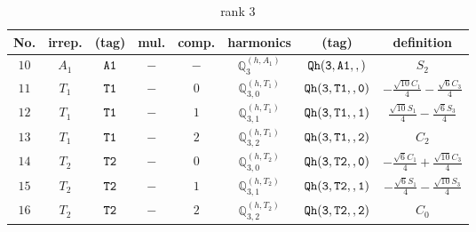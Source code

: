 \documentclass[fleqn,8pt]{jsarticle}
\begin{document}
\begin{table}[ht!]
\begin{center}
\caption{rank 3}
\renewcommand{\arraystretch}{1.3}
\begin{tabular}{cccccccc} \hline \hline
No. & irrep. & (tag) & mul. & comp. & harmonics & (tag) & definition \\ \hline
$ 10 $ & $ A_{1} $ & $ {\tt A1} $ & $ - $ & $ - $ & $ \mathbb{Q}_{3}^{(h,A_{1})} $ & $ {\tt Qh(3,A1,,)} $ & $ S_{2} $ \\
$ 11 $ & $ T_{1} $ & $ {\tt T1} $ & $ - $ & $ 0 $ & $ \mathbb{Q}_{3,0}^{(h,T_{1})} $ & $ {\tt Qh(3,T1,,0)} $ & $ - \frac{\sqrt{10} C_{1}}{4} - \frac{\sqrt{6} C_{3}}{4} $ \\
$ 12 $ & $ T_{1} $ & $ {\tt T1} $ & $ - $ & $ 1 $ & $ \mathbb{Q}_{3,1}^{(h,T_{1})} $ & $ {\tt Qh(3,T1,,1)} $ & $ \frac{\sqrt{10} S_{1}}{4} - \frac{\sqrt{6} S_{3}}{4} $ \\
$ 13 $ & $ T_{1} $ & $ {\tt T1} $ & $ - $ & $ 2 $ & $ \mathbb{Q}_{3,2}^{(h,T_{1})} $ & $ {\tt Qh(3,T1,,2)} $ & $ C_{2} $ \\
$ 14 $ & $ T_{2} $ & $ {\tt T2} $ & $ - $ & $ 0 $ & $ \mathbb{Q}_{3,0}^{(h,T_{2})} $ & $ {\tt Qh(3,T2,,0)} $ & $ - \frac{\sqrt{6} C_{1}}{4} + \frac{\sqrt{10} C_{3}}{4} $ \\
$ 15 $ & $ T_{2} $ & $ {\tt T2} $ & $ - $ & $ 1 $ & $ \mathbb{Q}_{3,1}^{(h,T_{2})} $ & $ {\tt Qh(3,T2,,1)} $ & $ - \frac{\sqrt{6} S_{1}}{4} - \frac{\sqrt{10} S_{3}}{4} $ \\
$ 16 $ & $ T_{2} $ & $ {\tt T2} $ & $ - $ & $ 2 $ & $ \mathbb{Q}_{3,2}^{(h,T_{2})} $ & $ {\tt Qh(3,T2,,2)} $ & $ C_{0} $ \\
 \hline \hline
\end{tabular}
\end{center}
\end{table}
\end{document}
